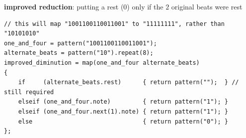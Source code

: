 \documentclass[11pt,twoside]{article}
\begin{document}
\textbf{improved reduction}: putting a rest (0) only if the $2$ original beats were rest
\begin{verbatim}
// this will map "1001100110011001" to "11111111", rather than "10101010"
one_and_four = pattern("1001100110011001");
alternate_beats = pattern("10").repeat(8);
improved_diminution = map(one_and_four alternate_beats)
{
    if     (alternate_beats.rest)      { return pattern("");  } // still required
    elseif (one_and_four.note)         { return pattern("1"); }
    elseif (one_and_four.next(1).note) { return pattern("1"); }
    else                               { return pattern("0"); }
};
\end{verbatim}
\end{document}
